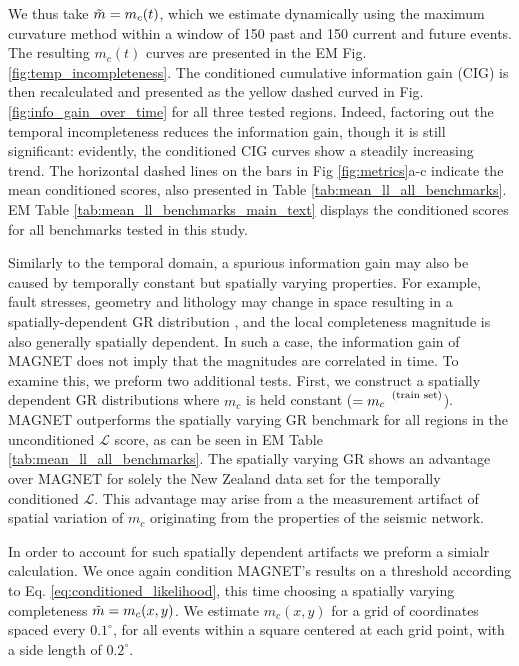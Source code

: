\documentclass[pdflatex]{sn-jnl}
\begin{document}
We thus take $\Tilde{m}=m_c(t)$, which we estimate dynamically using the maximum curvature method \cite{wiemer_minimum_2000} within a window of 150 past and 150 current and future events. The resulting $m_c(t)$ curves are presented in the EM Fig. \ref{fig:temp_incompleteness}. The conditioned cumulative information gain (CIG) is then recalculated and presented as the yellow dashed curved in Fig.  \ref{fig:info_gain_over_time} for all three tested regions. 
Indeed, factoring out the temporal incompleteness reduces the information gain, though it is still significant: evidently, the conditioned CIG curves show a steadily increasing trend. The horizontal dashed lines on the bars in Fig \ref{fig:metrics}a-c indicate the mean conditioned scores, also presented in Table \ref{tab:mean_ll_all_benchmarks}. EM Table \ref{tab:mean_ll_benchmarks_main_text} displays the conditioned scores for all benchmarks tested in this study.

Similarly to the temporal domain, a spurious information gain may also be caused by temporally constant but spatially varying properties. For example, fault stresses, geometry and lithology may change in space resulting in a spatially-dependent GR distribution \cite{amitrano_brittle-ductile_2003, scholz_stress_2015, herrmann_revealing_2022, taroni_earthquake_2023}, and the local completeness magnitude is also generally spatially dependent. In such a case, the information gain of MAGNET does not imply that the magnitudes are correlated in time. 
To examine this, we preform two additional tests. First, we construct a spatially dependent GR distributions where $m_c$ is held constant ($=m_c^{\mbox{\footnotesize (train set)}}$). MAGNET outperforms the spatially varying GR benchmark for all regions in the unconditioned $\mathcal{L}$ score, as can be seen in EM Table \ref{tab:mean_ll_all_benchmarks}. The spatially varying GR shows an advantage over MAGNET for solely the New Zealand data set for the temporally conditioned $\mathcal{L}$. This advantage may arise from a the measurement artifact of spatial variation of $m_c$ originating from the properties of the seismic network.

In order to account for such spatially dependent artifacts we preform a simialr calculation. We once again condition MAGNET's results on a threshold according to Eq. \ref{eq:conditioned_likelihood}, this time choosing a spatially varying completeness $\Tilde{m}=m_c(x,y)$. We estimate $m_c(x,y)$ for a grid of coordinates spaced every $0.1^\circ$, for all events within a square centered at each grid point, with a side length of $0.2^\circ$. 
\end{document}
